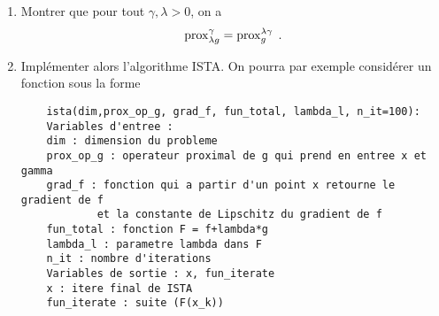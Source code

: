 \documentclass[a4paper,french,12pt]{article}
\begin{document}
\begin{enumerate}
\item Montrer que pour tout $\gamma, \lambda >0$, on a
  \begin{equation*}
    \operatorname{prox}_{\lambda g}^{\gamma} = \operatorname{prox}_{ g}^{\lambda \gamma} \;.
  \end{equation*}
\item Implémenter alors l'algorithme ISTA. On pourra par exemple considérer un fonction
  sous la forme
  \begin{lstlisting}
    ista(dim,prox_op_g, grad_f, fun_total, lambda_l, n_it=100):
    Variables d'entree :
    dim : dimension du probleme
    prox_op_g : operateur proximal de g qui prend en entree x et gamma
    grad_f : fonction qui a partir d'un point x retourne le gradient de f
            et la constante de Lipschitz du gradient de f
    fun_total : fonction F = f+lambda*g
    lambda_l : parametre lambda dans F
    n_it : nombre d'iterations
    Variables de sortie : x, fun_iterate
    x : itere final de ISTA
    fun_iterate : suite (F(x_k))
  \end{lstlisting}
\end{enumerate}
\end{document}
